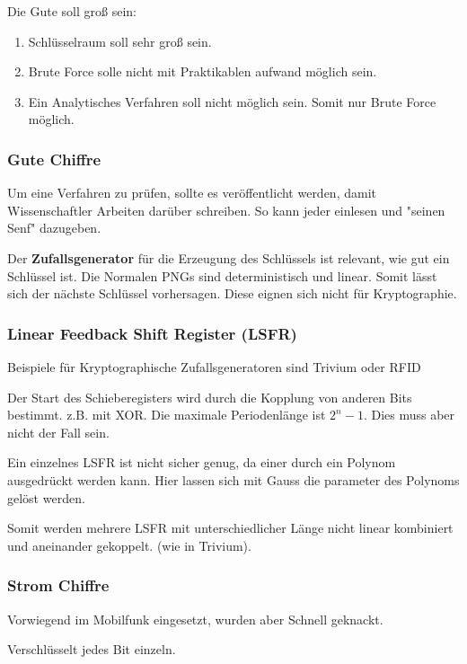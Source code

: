 \documentclass[a4paper]{article}
\begin{document}
Die Gute soll groß sein:

\begin{enumerate}
    \item Schlüsselraum soll sehr groß sein.
    \item Brute Force solle nicht mit Praktikablen aufwand möglich sein.
    \item Ein Analytisches Verfahren soll nicht möglich sein. Somit nur Brute Force möglich.
\end{enumerate}

\subsubsection{Gute Chiffre}

Um eine Verfahren zu prüfen, sollte es veröffentlicht werden, damit Wissenschaftler Arbeiten darüber schreiben. So kann jeder einlesen und "seinen Senf" dazugeben.

Der \textbf{Zufallsgenerator} für die Erzeugung des Schlüssels ist relevant, wie gut ein Schlüssel ist. Die Normalen PNGs sind deterministisch und linear. Somit lässt sich der nächste Schlüssel vorhersagen. Diese eignen sich nicht für Kryptographie.

\subsubsection{Linear Feedback Shift Register (LSFR)}

Beispiele für Kryptographische Zufallsgeneratoren sind Trivium oder RFID

Der Start des Schieberegisters wird durch die Kopplung von anderen Bits bestimmt. z.B. mit XOR. Die maximale Periodenlänge ist $2^n-1$. Dies muss aber nicht der Fall sein.

Ein einzelnes LSFR ist nicht sicher genug, da einer durch ein Polynom ausgedrückt werden kann. Hier lassen sich mit Gauss die parameter des Polynoms gelöst werden.

Somit werden mehrere LSFR mit unterschiedlicher Länge nicht linear kombiniert und aneinander gekoppelt. (wie in Trivium).

\subsubsection{Strom Chiffre}

Vorwiegend im Mobilfunk eingesetzt, wurden aber Schnell geknackt.

Verschlüsselt jedes Bit einzeln.
\end{document}
